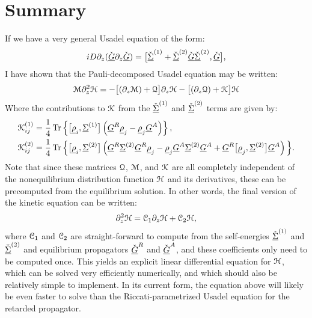 \section{Summary}
If we have a very general Usadel equation of the form:
\begin{align}
  iD \partial_z(\check{\underline{G}} \partial_z \check{\underline{G}}) = \big[ \check{\underline{\Sigma}}^{(1)} + \check{\underline{\Sigma}}^{(2)}\check{\underline{G}}\check{\underline{\Sigma}}^{(2)}, \check{\underline{G}} \big],
\end{align} 
I have shown that the Pauli-decomposed Usadel equation may be written:
\begin{equation}
  \mathcal{M} \partial_z^2 \mathcal{H} = -\big[ (\partial_z\mathcal{M}) + \mathcal{Q} \big] \partial_z \mathcal{H} - \big[ (\partial_z \mathcal{Q}) + \mathcal{K} \big] \mathcal{H}
\end{equation}
Where the contributions to $\mathcal{K}$ from the $\check{\underline{\Sigma}}^{(1)}$ and $\check{\underline{\Sigma}}^{(2)}$ terms are given by:
\begin{align*}
  \mathcal{K}_{ij}^{(1)}
  &= 
  \frac{1}{4} \operatorname{Tr}\left\{ \big[{\underline{\rho}_i}, {\underline{\Sigma}}^{(1)}\big] \left({\underline{G}}^R {\underline{\rho}}_j - {\underline{\rho}}_j {\underline{G}}^A\right) \right\},
  \\
  \mathcal{K}_{ij}^{(2)}
  &= 
  \frac{1}{4} \operatorname{Tr} 
  \Big\{
      \big[ {\underline{\rho}}_i, {\underline{\Sigma}}^{(2)} \big]
      \left( 
        {\underline{G}}^R {\underline{\Sigma}}^{(2)} {\underline{G}}^R {\underline{\rho}}_j
      - {\underline{\rho}}_j {\underline{G}}^A {\underline{\Sigma}}^{(2)} {\underline{G}}^A
      + {\underline{G}}^R \big[{\underline{\rho}}_j, {\underline{\Sigma}}^{(2)} \big] {\underline{G}}^A
      \right)
  \Big\}.
\end{align*}
Note that since these matrices $\mathcal{Q}$, $\mathcal{M}$, and $\mathcal{K}$ are all completely independent of the nonequilibrium distribution function $\mathcal{H}$ and its derivatives, these can be precomputed from the equilibrium solution.
In other words, the final version of the kinetic equation can be written:
\begin{equation}
  \partial_z^2\mathcal{H} = \mathcal{C}_1 \partial_z \mathcal{H} + \mathcal{C}_2 \mathcal{H},
\end{equation}
where $\mathcal{C}_1$ and $\mathcal{C}_2$ are straight-forward to compute from the self-energies ${\check{\underline{\Sigma}}}^{(1)}$ and ${\check{\underline{\Sigma}}}^{(2)}$ and equilibrium propagators ${\check{\underline{G}}}^R$ and ${\check{\underline{G}}}^A$, and these coefficients only need to be computed once.
This yields an explicit linear differential equation for $\mathcal{H}$, which can be solved very efficiently numerically, and which should also be relatively simple to implement.
In its current form, the equation above will likely be even faster to solve than the Riccati-parametrized Usadel equation for the retarded propagator.
